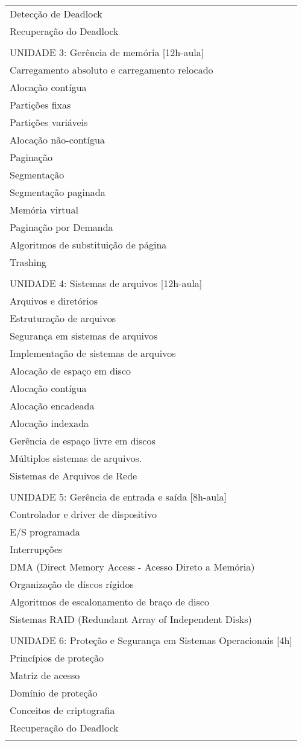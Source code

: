 \documentclass[12pt]{article}
\begin{document}
\begin{longtable}{|L{1.025\textwidth}|}
Detecção de Deadlock\\
Recuperação do Deadlock\\
\\
UNIDADE 3: Gerência de memória [12h-aula]\\
Carregamento absoluto e carregamento relocado\\
Alocação contígua\\
Partições fixas\\
Partições variáveis\\
Alocação não-contígua\\
Paginação\\
Segmentação\\
Segmentação paginada\\
Memória virtual\\
Paginação por Demanda\\
Algoritmos de substituição de página\\
Trashing\\
\\
UNIDADE 4: Sistemas de arquivos [12h-aula]\\
Arquivos e diretórios\\
Estruturação de arquivos\\
Segurança em sistemas de arquivos\\
Implementação de sistemas de arquivos\\
Alocação de espaço em disco\\
Alocação contígua\\
Alocação encadeada\\
Alocação indexada\\
Gerência de espaço livre em discos\\
Múltiplos sistemas de arquivos.\\
Sistemas de Arquivos de Rede\\
\\
UNIDADE 5: Gerência de entrada e saída [8h-aula]\\
Controlador e driver de dispositivo\\
E/S programada\\
Interrupções\\
DMA (Direct Memory Access - Acesso Direto a Memória)\\
Organização de discos rígidos\\
Algoritmos de escalonamento de braço de disco		\\
Sistemas RAID (Redundant Array of Independent Disks)\\
\\
UNIDADE 6: Proteção e Segurança em Sistemas Operacionais [4h]\\
Princípios de proteção\\
Matriz de acesso\\
Domínio de proteção\\
Conceitos de criptografia\\
Recuperação do Deadlock\\


\\ \hline
\end{longtable} 
\end{document}
